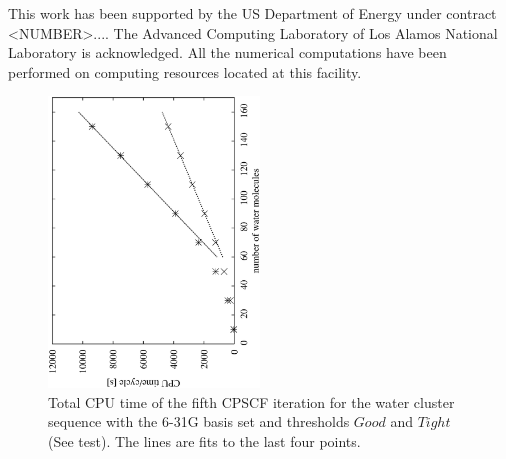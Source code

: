 \documentclass[twocolumn,showpacs,preprintnumbers,amsmath,amssymb]{revtex4}
\begin{document}
\begin{acknowledgments}
 This work has been supported by the US Department of Energy 
 under contract <NUMBER>.... The Advanced Computing Laboratory of Los 
 Alamos National Laboratory is acknowledged.
 All the numerical computations have been
 performed on computing resources located at this facility.
\end{acknowledgments}

\begin{figure}
  \centering
  \caption{\protect
  Total CPU time of the fifth CPSCF iteration for the water
  cluster sequence with
  the 6-31G basis set and thresholds $Good$ and $Tight$ (See test).
  The lines are fits to the last four points.
  }\label{fig:Alpha_h2o3D_6-31G_G_T_t}
  \begin{center}
    \includegraphics[angle=-90,width=0.5\textwidth]{Alpha_h2o3D_6-31G_G_T_t}
  \end{center}
\end{figure}
\end{document}
